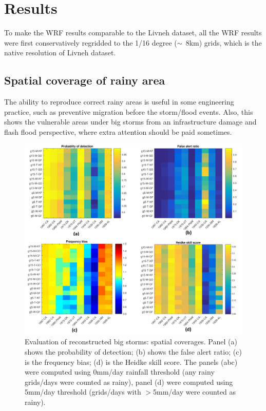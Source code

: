 \section{Results}

To make the WRF results comparable to the Livneh dataset, all the WRF results were first conservatively regridded to the 1/16 degree ($\scriptsize{\sim}$ 8km) grids, which is the native resolution of Livneh dataset.

\subsection{Spatial coverage of rainy area}

The ability to reproduce correct rainy areas is useful in some engineering practice, such as preventive migration before the storm/flood events. Also, this shows the vulnerable areas under big storms from an infrastructure damage and flash flood perspective, where extra attention should be paid sometimes.

\begin{figure}[htbp]
	\includegraphics[width=\linewidth]{pics/ch3/fig2.jpg}
	\caption{Evaluation of reconstructed big storms: spatial coverages. Panel (a) shows the probability of detection; (b) shows the false alert ratio; (c) is the frequency bias; (d) is the Heidke skill score. The panels (abc) were computed using 0mm/day rainfall threshold (any rainy grids/days were counted as rainy), panel (d) were computed using 5mm/day threshold (grids/days with $>$5mm/day were counted as rainy).}
	\label{fig:3-2}
\end{figure}


